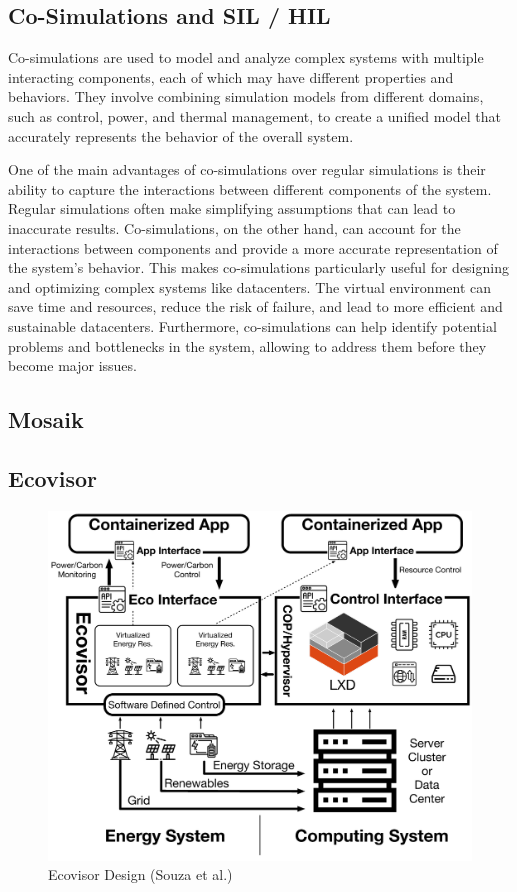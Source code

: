 \subsection{Co-Simulations and SIL / HIL}

Co-simulations are used to model and analyze complex systems with multiple
interacting components, each of which may have different properties and
behaviors. They involve combining simulation models from different domains, such
as control, power, and thermal management, to create a unified model that
accurately represents the behavior of the overall system.

One of the main advantages of co-simulations over regular simulations is their
ability to capture the interactions between different components of the system.
Regular simulations often make simplifying assumptions that can lead to
inaccurate results. Co-simulations, on the other hand, can account for the
interactions between components and provide a more accurate representation of
the system's behavior. This makes co-simulations particularly useful for
designing and optimizing complex systems like datacenters. The virtual
environment can save time and resources, reduce the risk of failure, and lead to
more efficient and sustainable datacenters. Furthermore, co-simulations can help
identify potential problems and bottlenecks in the system, allowing to address
them before they become major issues.

\subsection{Mosaik}
\subsection{Ecovisor}

\begin{figure}
    \centering
    \includegraphics[width=\linewidth]{figures/ecovisor_design}
    \caption{Ecovisor Design (Souza et al.) \cite{souza2023}}
    \label{fig:ecovisor_design}
\end{figure}
